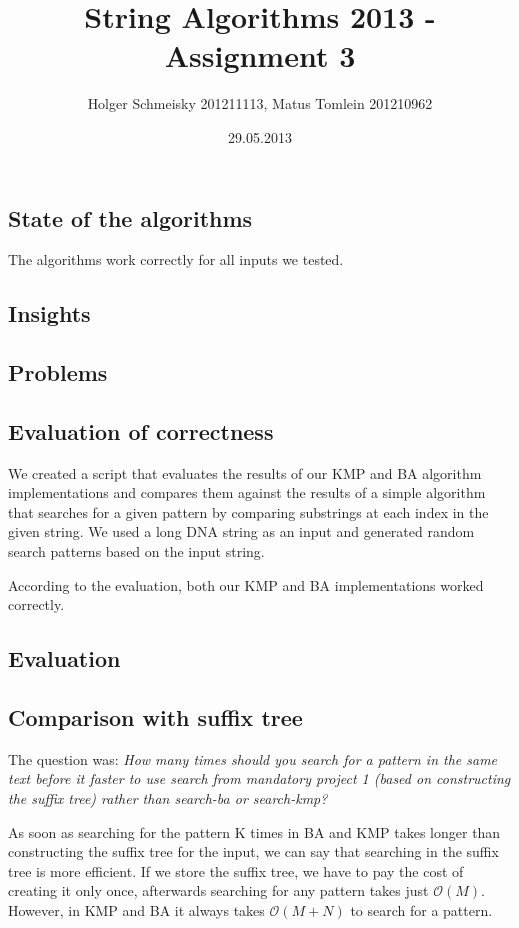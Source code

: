 \documentclass[a4paper,10pt]{article}
\title{String Algorithms 2013 - Assignment 3}
\author{Holger Schmeisky  201211113, Matus Tomlein 201210962}
\date{29.05.2013}
\begin{document}
\maketitle

\subsection*{State of the algorithms}
The algorithms work correctly for all inputs we tested.

\subsection*{Insights}


\subsection*{Problems}


\subsection*{Evaluation of correctness}

We created a script that evaluates the results of our KMP and BA algorithm
implementations and compares them against the results of a simple algorithm
that searches for a given pattern by comparing substrings at each index
in the given string.
We used a long DNA string as an input and generated random search patterns
based on the input string.

According to the evaluation, both our KMP and BA implementations worked
correctly.

\clearpage
\subsection*{Evaluation}

\subsection*{Comparison with suffix tree}

The question was:
\emph{How many times should you search for a pattern in the same text before it faster to use search from mandatory project 1 (based on constructing the suffix tree) rather than search-ba or search-kmp?}

As soon as searching for the pattern K times in BA and KMP takes longer
than constructing the suffix tree for the input, we can say that searching in
the suffix tree is more efficient.
If we store the suffix tree, we have to pay the cost of creating it only once,
afterwards searching for any pattern takes just $\mathcal{O}(M)$.
However, in KMP and BA it always takes $\mathcal{O}(M+N)$ to search for a pattern.
\end{document}
